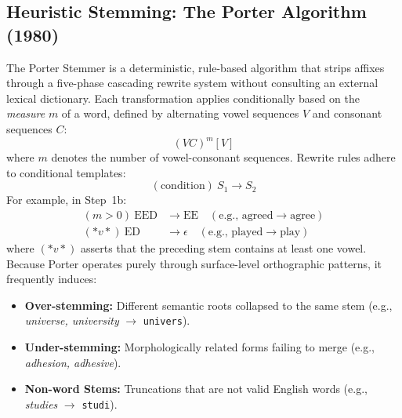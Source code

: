 \documentclass[12pt,a4paper]{report}
\begin{document}
\subsection{Heuristic Stemming: The Porter Algorithm (1980)}
The Porter Stemmer is a deterministic, rule-based algorithm that strips affixes through a five-phase cascading rewrite system without consulting an external lexical dictionary. Each transformation applies conditionally based on the \textit{measure} $m$ of a word, defined by alternating vowel sequences $V$ and consonant sequences $C$:
\begin{equation}
    [C](VC)^m[V]
\end{equation}
where $m$ denotes the number of vowel-consonant sequences. Rewrite rules adhere to conditional templates:
\begin{equation}
    (\text{condition})\ S_1 \to S_2
\end{equation}
For example, in Step~1b:
\begin{align}
    (m > 0)\ \text{EED} &\to \text{EE} \quad (\text{e.g., agreed} \to \text{agree}) \\
    (*v*)\ \text{ED} &\to \epsilon \quad (\text{e.g., played} \to \text{play})
\end{align}
where $(*v*)$ asserts that the preceding stem contains at least one vowel. Because Porter operates purely through surface-level orthographic patterns, it frequently induces:
\begin{itemize}
    \item \textbf{Over-stemming:} Different semantic roots collapsed to the same stem (e.g., \textit{universe, university} $\to$ \texttt{univers}).
    \item \textbf{Under-stemming:} Morphologically related forms failing to merge (e.g., \textit{adhesion, adhesive}).
    \item \textbf{Non-word Stems:} Truncations that are not valid English words (e.g., \textit{studies} $\to$ \texttt{studi}).
\end{itemize}
\end{document}
